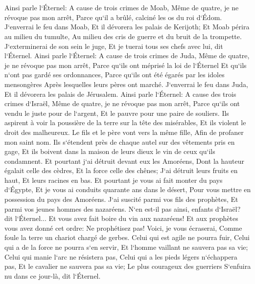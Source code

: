\chapter{}

\verse Ainsi parle l`Éternel: A cause de trois crimes de Moab, Même de quatre, je ne révoque pas mon arrêt, Parce qu`il a brûlé, calciné les os du roi d`Édom. 
\verse J`enverrai le feu dans Moab, Et il dévorera les palais de Kerijoth; Et Moab périra au milieu du tumulte, Au milieu des cris de guerre et du bruit de la trompette. 
\verse J`exterminerai de son sein le juge, Et je tuerai tous ses chefs avec lui, dit l`Éternel. 
\verse Ainsi parle l`Éternel: A cause de trois crimes de Juda, Même de quatre, je ne révoque pas mon arrêt, Parce qu`ils ont méprisé la loi de l`Éternel Et qu`ils n`ont pas gardé ses ordonnances, Parce qu`ils ont été égarés par les idoles mensongères Après lesquelles leurs pères ont marché. 
\verse J`enverrai le feu dans Juda, Et il dévorera les palais de Jérusalem. 
\verse Ainsi parle l`Éternel: A cause des trois crimes d`Israël, Même de quatre, je ne révoque pas mon arrêt, Parce qu`ils ont vendu le juste pour de l`argent, Et le pauvre pour une paire de souliers. 
\verse Ils aspirent à voir la poussière de la terre sur la tête des misérables, Et ils violent le droit des malheureux. Le fils et le père vont vers la même fille, Afin de profaner mon saint nom. 
\verse Ils s`étendent près de chaque autel sur des vêtements pris en gage, Et ils boivent dans la maison de leurs dieux le vin de ceux qu`ils condamnent. 
\verse Et pourtant j`ai détruit devant eux les Amoréens, Dont la hauteur égalait celle des cèdres, Et la force celle des chênes; J`ai détruit leurs fruits en haut, Et leurs racines en bas. 
\verse Et pourtant je vous ai fait monter du pays d`Égypte, Et je vous ai conduits quarante ans dans le désert, Pour vous mettre en possession du pays des Amoréens. 
\verse J`ai suscité parmi vos fils des prophètes, Et parmi vos jeunes hommes des nazaréens. N`en est-il pas ainsi, enfants d`Israël? dit l`Éternel... 
\verse Et vous avez fait boire du vin aux nazaréens! Et aux prophètes vous avez donné cet ordre: Ne prophétisez pas! 
\verse Voici, je vous écraserai, Comme foule la terre un chariot chargé de gerbes. 
\verse Celui qui est agile ne pourra fuir, Celui qui a de la force ne pourra s`en servir, Et l`homme vaillant ne sauvera pas sa vie; 
\verse Celui qui manie l`arc ne résistera pas, Celui qui a les pieds légers n`échappera pas, Et le cavalier ne sauvera pas sa vie; 
\verse Le plus courageux des guerriers S`enfuira nu dans ce jour-là, dit l`Éternel. 

